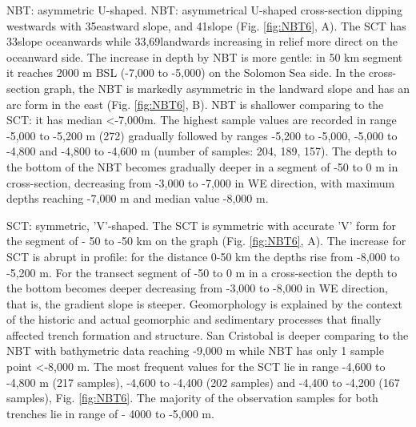 \documentclass[11pt,a4paper]{report}
\begin{document}
{\ac{NBT}: asymmetric U-shaped. \ac{NBT}: asymmetrical U-shaped cross-section dipping westwards with 35\degree\space eastward slope, and 41\degree\space slope (Fig. \ref{fig:NBT6}, A). The \ac{SCT} has 33\degree\space slope oceanwards while 33,69\degree\space landwards increasing in relief more direct on the oceanward side. The increase in depth by \ac{NBT} is more gentle: in 50 km segment it reaches 2000 m \ac{BSL} (-7,000 to -5,000) on the Solomon Sea side. In the cross-section graph, the \ac{NBT} is markedly asymmetric in the landward slope and has an arc form in the east (Fig. \ref{fig:NBT6}, B). \ac{NBT} is shallower comparing to the \ac{SCT}: it has median <-7,000m. The highest sample values are recorded in range -5,000 to -5,200 m (272) gradually followed by ranges -5,200 to -5,000, -5,000 to -4,800 and -4,800 to -4,600 m (number of samples: 204, 189, 157). The depth to the bottom of the \ac{NBT} becomes gradually deeper in a segment of -50 to 0 m in cross-section, decreasing from -3,000 to -7,000 in WE direction, with maximum depths reaching -7,000 m and median value -8,000 m. 

\ac{SCT}: symmetric, 'V'-shaped. The \ac{SCT} is symmetric with accurate 'V' form for the segment of - 50 to -50 km on the graph (Fig. \ref{fig:NBT6}, A). The increase for \ac{SCT} is abrupt in profile: for the distance 0-50 km the depths rise from -8,000 to -5,200 m. For the transect segment of -50 to 0 m in a cross-section the depth to the bottom becomes deeper decreasing from -3,000 to -8,000 in WE direction, that is, the gradient slope is steeper. Geomorphology is explained by the context of the historic and actual geomorphic and sedimentary processes that finally affected trench formation and structure. San Cristobal is deeper comparing to the \ac{NBT} with bathymetric data reaching -9,000 m while \ac{NBT} has only 1 sample point <-8,000 m. The most frequent values for the \ac{SCT} lie in range -4,600 to -4,800 m (217 samples), -4,600 to -4,400 (202 samples) and -4,400 to -4,200 (167 samples), Fig. \ref{fig:NBT6}. The majority of the observation samples for both trenches lie in range of - 4000 to -5,000 m.  

}
\end{document}
